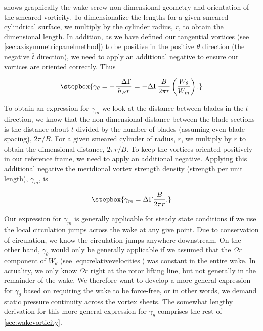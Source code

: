  shows graphically the wake screw non-dimensional geometry and orientation of the smeared vorticity.
%
To dimensionalize the lengths for a given smeared cylindrical surface, we multiply by the cylinder radius, \(r\), to obtain the dimensional length.
%
In addition, as we have defined our tangential vortices (see \cref{sec:axisymmetricpanelmethod}) to be positive in the positive \(\theta\) direction (the negative \(\overline{t}\) direction), we need to apply an additional negative to ensure our vortices are oriented correctly.
%
Thus

\begin{equation}
    \label{eqn:gammat1}
    \stepbox{
    \gamma_\theta = -\frac{-\Delta\Gamma}{h_B r} = -\Delta \Gamma \frac{B }{2 \pi r} \left(\frac{W_\theta}{W_m}\right).
}
\end{equation}

To obtain an expression for \(\gamma_m\) we look at the distance between blades in the \(\overline{t}\) direction, we know that the non-dimensional distance between the blade sections is the distance about \(\overline{t}\) divided by the number of blades (assuming even blade spacing), \(2\pi/B\).
%
For a given smeared cylinder of radius, \(r\), we multiply by \(r\) to obtain the dimensional distance, \(2\pi r/B\).
%
To keep the vortices oriented positively in our reference frame, we need to apply an additional negative.%
%
Applying this additional negative the meridional vortex strength density (strength per unit length), \(\gamma_m\), is

\begin{equation}
    \label{eqn:gammam1}
    \stepbox{
    \gamma_m = \Delta\Gamma \frac{B}{2 \pi r}.
}
\end{equation}


Our expression for \(\gamma_m\) is generally applicable for steady state conditions if we use the local circulation jumps across the wake at any give point.
%
Due to conservation of circulation, we know the circulation jumps anywhere downstream.
%
On the other hand, \(\gamma_\theta\) would only be generally applicable if we assumed that the \(\Omega r\) component of \(W_\theta\) (see \cref{eqn:relativevelocities}) was constant in the entire wake.
%
In actuality, we only know \(\Omega r\) right at the rotor lifting line, but not generally in the remainder of the wake.
%
We therefore want to develop a more general expression for \(\gamma_\theta\) based on requiring the wake to be force-free, or in other words, we demand static pressure continuity across the vortex sheets.
%
The somewhat lengthy derivation for this more general expression for \(\gamma_\theta\) comprises the rest of \cref{sec:wakevorticity}.


